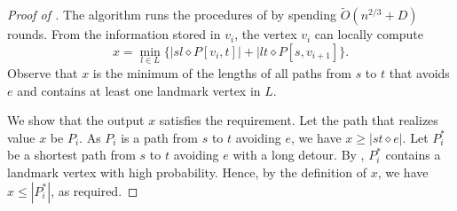 \begin{proof}[Proof of ]

    
    
    
The algorithm runs the procedures of  by spending  $\widetilde{O}(n^{2/3}+D)$ rounds. From the information stored in $v_i$, the vertex $v_i$ can locally compute 
     $$x=\min _{l \in L} \{ |sl \diamond P[v_i,t]| + |lt \diamond P[s,v_{i+1}]\}.$$
Observe that  $x$ is the minimum of the lengths of all paths from $s$ to $t$ that avoids $e$ and contains at least one landmark vertex in $L$.     
    
    We show that the output $x$ satisfies the requirement. Let the path that realizes value $x$ be $P_i$.
     As $P_i$ is a path from $s$ to $t$ avoiding $e$, we have $x \geq |st \diamond e|$.  Let $P_i^*$ be a shortest path from $s$ to $t$ avoiding $e$ with a long detour. By , $P_i^*$ contains a landmark vertex with high probability. Hence, by the definition of $x$, we have $x \leq |P_i^*|$, as required.
\end{proof}


    









